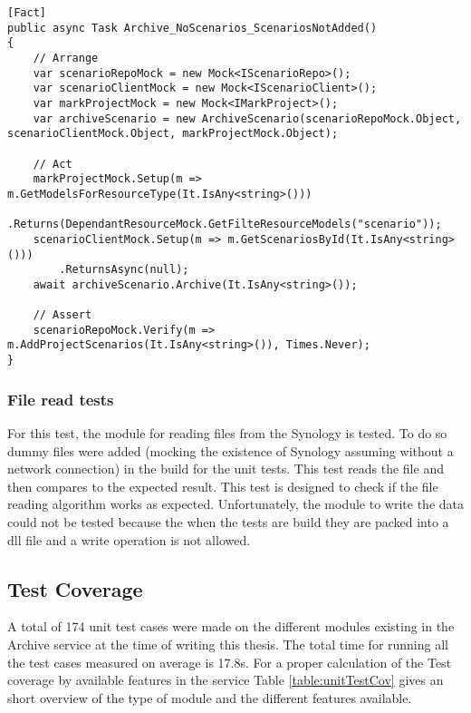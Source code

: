 \begin{lstlisting}[language={[Sharp]C}, caption={No scenarios added if resource empty}, captionpos=b,label={lst:scenarisEmpty}]
[Fact]
public async Task Archive_NoScenarios_ScenariosNotAdded()
{
    // Arrange
    var scenarioRepoMock = new Mock<IScenarioRepo>();
    var scenarioClientMock = new Mock<IScenarioClient>();
    var markProjectMock = new Mock<IMarkProject>();
    var archiveScenario = new ArchiveScenario(scenarioRepoMock.Object, scenarioClientMock.Object, markProjectMock.Object);
    
    // Act
    markProjectMock.Setup(m => m.GetModelsForResourceType(It.IsAny<string>()))
        .Returns(DependantResourceMock.GetFilteResourceModels("scenario"));
    scenarioClientMock.Setup(m => m.GetScenariosById(It.IsAny<string>()))
        .ReturnsAsync(null);
    await archiveScenario.Archive(It.IsAny<string>());                
    
    // Assert
    scenarioRepoMock.Verify(m => m.AddProjectScenarios(It.IsAny<string>()), Times.Never);
}
\end{lstlisting}

\subsubsection{File read tests}
For this test, the module for reading files from the Synology is tested. To do so dummy files were added (mocking the existence of Synology assuming without 
a network connection) in the build for the unit tests. This test reads the file
and then compares to the expected result. This test is designed to check if the file reading algorithm works as expected. Unfortunately, the module to write the data
could not be tested because the when the tests are build they are packed into a dll file and a write operation is not allowed.

\subsection{Test Coverage}
A total of 174 unit test cases were made on the different modules existing in the Archive service at the time of writing this thesis. The total time for running all 
the test cases measured on average is 17.8s. For a proper calculation of the Test coverage by available features in the service Table \ref{table:unitTestCov} gives an short
overview of the type of module and the different features available.

